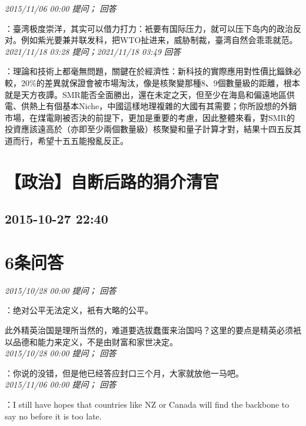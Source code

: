 \documentclass[twocolumn]{ctexart}
\begin{document}
\textit{\hfill\noindent\small 2015/11/06 00:00 提问； 回答}

：臺湾极度崇洋，其实可以借力打力：衹要有国际压力，就可以压下岛内的政治反对。例如紫光要兼并联发科，把WTO扯进来，威胁制裁，臺湾自然会乖乖就范。\\

\textit{\hfill\noindent\small 2021/11/18 03:28 提问；2021/11/18 03:49 回答}

：理論和技術上都毫無問題，關鍵在於經濟性：新科技的實際應用對性價比錙銖必較，20\%的差異就保證會被市場淘汰，像是核聚變那種8、9個數量級的距離，根本就是天方夜譚。SMR能否全面勝出，還在未定之天，但至少在海島和偏遠地區供電、供熱上有個基本Niche，中國這樣地理複雜的大國有其需要；你所設想的外銷市場，在煤電剛被否決的前提下，更加是重要的考慮，因此整體來看，對SMR的投資應該遠高於（亦即至少兩個數量級）核聚變和量子計算才對，結果十四五反其道而行，希望十五五能撥亂反正。
\\


\section{【政治】自断后路的狷介清官}
\subsection{2015-10-27 22:40}


\section{6条问答}

\textit{\hfill\noindent\small 2015/10/28 00:00 提问； 回答}

：绝对公平无法定义，衹有大略的公平。

此外精英治国是理所当然的，难道要选拔蠢蛋来治国吗？这里的要点是精英必须衹以品德和能力来定义，不是由财富和家世决定。\\

\textit{\hfill\noindent\small 2015/10/28 00:00 提问； 回答}

：你说的没错，但是他已经答应封口三个月，大家就放他一马吧。\\

\textit{\hfill\noindent\small 2015/11/06 00:00 提问； 回答}

：I still have hopes that countries like NZ or Canada will find the backbone to say no before it is too late.\\
\end{document}
